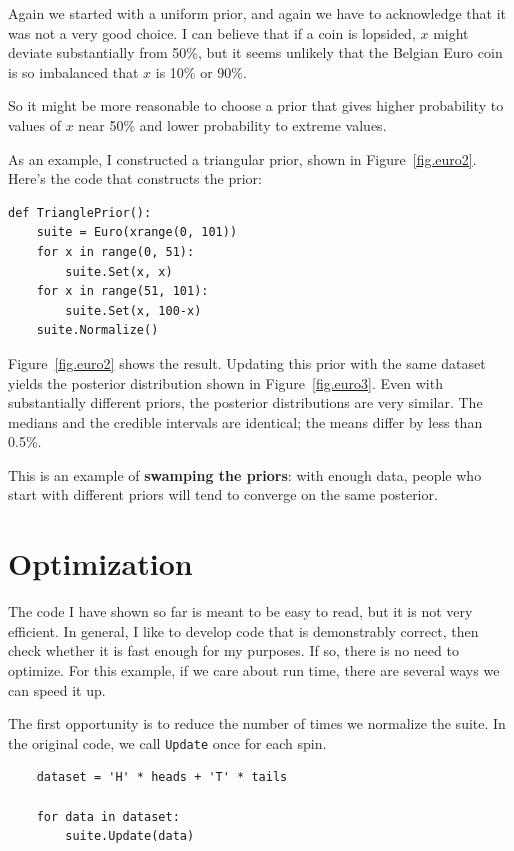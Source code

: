 \documentclass[12pt]{book}
\begin{document}
Again we started with a uniform prior, and again we have to
acknowledge that it was not a very good choice. I can believe
that if a coin is lopsided, $x$ might deviate substantially from
50\%, but it seems unlikely that the Belgian Euro coin is so
imbalanced that $x$ is 10\% or 90\%.

So it might be more reasonable to choose a prior that gives
higher probability to values of $x$ near 50\% and lower probability
to extreme values.

As an example, I constructed a triangular prior, shown in
Figure~\ref{fig.euro2}.  Here's the code that constructs the prior:

\begin{verbatim}
def TrianglePrior():
    suite = Euro(xrange(0, 101))
    for x in range(0, 51):
        suite.Set(x, x)
    for x in range(51, 101):
        suite.Set(x, 100-x) 
    suite.Normalize()
\end{verbatim}

Figure~\ref{fig.euro2} shows the result.  Updating this prior
with the same dataset yields the posterior distribution shown
in Figure~\ref{fig.euro3}.  Even with substantially different
priors, the posterior distributions are very similar.  The medians
and the credible intervals are identical; the means differ by
less than 0.5\%.

This is an example of {\bf swamping the priors}: with enough
data, people who start with different priors will tend to
converge on the same posterior.


\section{Optimization}

The code I have shown so far is meant to be easy to read, but it
is not very efficient.  In general, I like to develop code that
is demonstrably correct, then check whether it is fast enough for
my purposes.  If so, there is no need to optimize.
For this example, if we care about run time,
there are several ways we can speed it up.

The first opportunity is to reduce the number of times we
normalize the suite.
In the original code, we call \verb"Update" once for each spin.

\begin{verbatim}
    dataset = 'H' * heads + 'T' * tails

    for data in dataset:
        suite.Update(data)
\end{verbatim}
\end{document}
